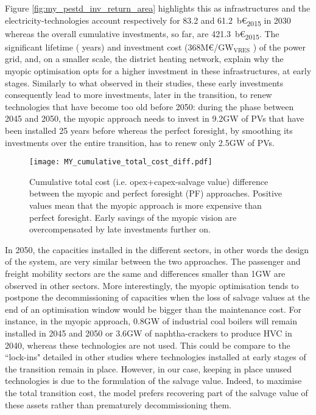 Figure \ref{fig:my_pestd_inv_return_area} highlights this as infrastructures and the electricity-technologies account respectively for 83.2 and 61.2~b€\textsubscript{2015} in 2030 whereas the overall cumulative investments, so far, are 421.3~b€\textsubscript{2015}. The significant lifetime ( years) and investment cost (\ie 368M€/GW$_\text{VRES}$ \cite{readthedocs_pathway}) of the power grid, and, on a smaller scale, the district heating network, explain why the myopic optimisation opts for a higher investment in these infrastructures, at early stages. Similarly to what \citet{keppo2010short} observed in their studies, these early investments consequently lead to more investments, later in the transition, to renew technologies that have become too old before 2050: during the phase between 2045 and 2050, the myopic approach needs to invest in 9.2GW of PVs that have been installed 25 years before whereas the perfect foresight, by smoothing its investments over the entire transition, has to renew only 2.5GW of PVs. 

\begin{figure}[!htbp]
\centering
\texttt{[image: MY\_cumulative\_total\_cost\_diff.pdf]}
\caption{Cumulative total cost (i.e. opex+capex-salvage value) difference between the myopic and perfect foresight (PF) approaches. Positive values mean that the myopic approach is more expensive than perfect foresight. Early savings of the myopic vision are overcompensated by late investments further on.}
\label{fig:my_pestd_total_cost_cum_diff}
\end{figure}

In 2050, the capacities installed in the different sectors, in other words the design of the system, are very similar between the two approaches. The passenger and freight mobility sectors are the same and differences smaller than 1GW are observed in other sectors. More interestingly, the myopic optimisation tends to postpone the decommissioning of capacities when the loss of salvage values at the end of an optimisation window would be bigger than the maintenance cost. For instance, in the myopic approach, 0.8GW of industrial coal boilers will remain installed in 2045 and 2050 or 3.6GW of naphtha-crackers to produce HVC in 2040, whereas these technologies are not used. This could be compare to the ``lock-ins" detailed in other studies \cite{heuberger2018impact,keppo2010short} where technologies installed at early stages of the transition remain in place. However, in our case, keeping in place unused technologies is due to the formulation of the salvage value. Indeed, to maximise the total transition cost, the model prefers recovering part of the salvage value of these assets rather than prematurely decommissioning them.


